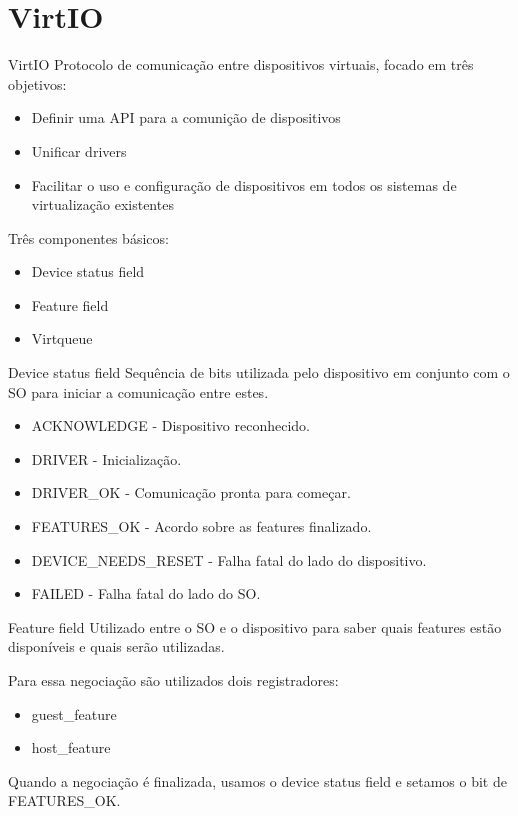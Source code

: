 \documentclass[brazil,nolapesd,aspectratio=169,noartschool]{lapesd-slides}
\begin{document}
\section{VirtIO}

\begin{frame}{VirtIO}
	Protocolo de comunicação entre dispositivos virtuais, focado em três objetivos:

	\begin{itemize}
		\item Definir uma API para a comunição de dispositivos
		\item Unificar drivers
		\item Facilitar o uso e configuração de dispositivos em todos os sistemas de virtualização existentes
	\end{itemize}

	Três componentes básicos:
	\begin{itemize}
		\item Device status field
		\item Feature field
		\item Virtqueue
	\end{itemize}
\end{frame}

\begin{frame}{Device status field}
	Sequência de bits utilizada pelo dispositivo em conjunto com o SO para iniciar a comunicação entre estes.

	\begin{itemize}
		\item ACKNOWLEDGE - Dispositivo reconhecido.
		\item DRIVER - Inicialização.
		\item DRIVER{\_}OK - Comunicação pronta para começar.
		\item FEATURES{\_}OK - Acordo sobre as features finalizado.
		\item DEVICE{\_}NEEDS{\_}RESET - Falha fatal do lado do dispositivo.
		\item FAILED - Falha fatal do lado do SO.
	\end{itemize}
\end{frame}

\begin{frame}{Feature field}
	Utilizado entre o SO e o dispositivo para saber quais features estão disponíveis e quais serão utilizadas.

	Para essa negociação são utilizados dois registradores:
	\begin{itemize}
		\item guest{\_}feature
		\item host{\_}feature
	\end{itemize}

	Quando a negociação é finalizada, usamos o device status field e setamos o bit de FEATURES{\_}OK.
\end{frame}
\end{document}
